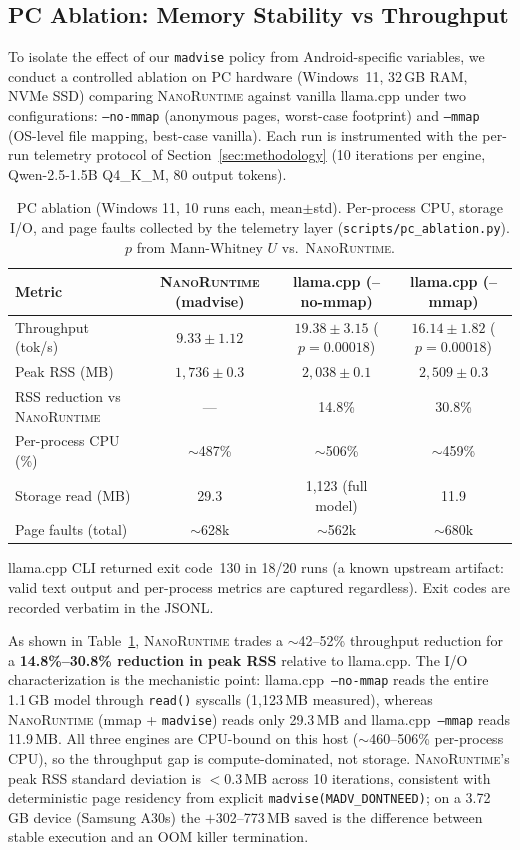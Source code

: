 \documentclass[11pt]{article}
\newcommand{\nanort}{\textsc{NanoRuntime}}
\begin{document}
\subsection{PC Ablation: Memory Stability vs Throughput}
\label{sec:pc_ablation}

To isolate the effect of our \texttt{madvise} policy from Android-specific
variables, we conduct a controlled ablation on PC hardware (Windows~11,
32\,GB RAM, NVMe SSD) comparing \nanort{} against vanilla llama.cpp under
two configurations: \texttt{--no-mmap} (anonymous pages, worst-case footprint)
and \texttt{--mmap} (OS-level file mapping, best-case vanilla). Each run is
instrumented with the per-run telemetry protocol of
Section~\ref{sec:methodology} (10 iterations per engine, Qwen-2.5-1.5B
Q4\_K\_M, 80 output tokens).

\begin{table}[h]
\centering
\caption{PC ablation (Windows 11, 10 runs each, mean$\pm$std). Per-process
CPU, storage I/O, and page faults collected by the telemetry layer
(\texttt{scripts/pc\_ablation.py}). $p$ from Mann-Whitney $U$ vs.~\nanort{}.}
\label{tab:pc_ablation}
\begin{tabular}{lccc}
\toprule
Metric & \nanort{} (madvise) & llama.cpp (--no-mmap) & llama.cpp (--mmap) \\
\midrule
Throughput (tok/s) & $9.33\pm1.12$ & $19.38\pm3.15$ ($p{=}0.00018$) & $16.14\pm1.82$ ($p{=}0.00018$) \\
Peak RSS (MB) & $1{,}736\pm0.3$ & $2{,}038\pm0.1$ & $2{,}509\pm0.3$ \\
RSS reduction vs \nanort{} & --- & 14.8\% & 30.8\% \\
Per-process CPU (\%) & $\sim$487\% & $\sim$506\% & $\sim$459\% \\
Storage read (MB) & 29.3 & 1,123 (full model) & 11.9 \\
Page faults (total) & $\sim$628k & $\sim$562k & $\sim$680k \\
\bottomrule
\end{tabular}
\par\smallskip
\footnotesize *llama.cpp CLI returned exit code~130 in 18/20 runs (a known
upstream artifact: valid text output and per-process metrics are captured
regardless). Exit codes are recorded verbatim in the JSONL.
\end{table}

As shown in Table~\ref{tab:pc_ablation}, \nanort{} trades a $\sim$42--52\%
throughput reduction for a \textbf{14.8\%--30.8\% reduction in peak RSS}
relative to llama.cpp. The I/O characterization is the mechanistic point:
llama.cpp~\texttt{--no-mmap} reads the entire 1.1\,GB model through
\texttt{read()} syscalls (1{,}123\,MB measured), whereas \nanort{} (mmap +
\texttt{madvise}) reads only 29.3\,MB and llama.cpp~\texttt{--mmap} reads
11.9\,MB. All three engines are CPU-bound on this host ($\sim$460--506\%
per-process CPU), so the throughput gap is compute-dominated, not storage.
\nanort{}'s peak RSS standard deviation is $<0.3$\,MB across 10 iterations,
consistent with deterministic page residency from explicit
\texttt{madvise(MADV\_DONTNEED)}; on a 3.72\,GB device (Samsung A30s) the
$+$302--773\,MB saved is the difference between stable execution and an OOM
killer termination.
\end{document}
